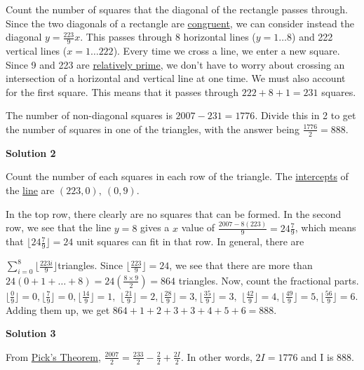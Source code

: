 \begin{enumerate}
 Count the number of squares that the diagonal of the rectangle passes through. Since the two diagonals of a rectangle are \href{https://artofproblemsolving.com/wiki/index.php?title=Congruent}{congruent}, we can consider instead the diagonal $y = \frac{223}{9}x$. This passes through 8 horizontal lines ($y = 1 \ldots 8$) and 222 vertical lines ($x = 1 \ldots 222$). Every time we cross a line, we enter a new square. Since 9 and 223 are \href{https://artofproblemsolving.com/wiki/index.php?title=Relatively\_prime}{relatively prime}, we don’t have to worry about crossing an intersection of a horizontal and vertical line at one time. We must also account for the first square. This means that it passes through $222 + 8 + 1 = 231$ squares.

 The number of non-diagonal squares is $2007 - 231 = 1776$. Divide this in 2 to get the number of squares in one of the triangles, with the answer being $\frac{1776}2 = 888$.

 



\textbf{Solution 2}

Count the number of each squares in each row of the triangle. The \href{https://artofproblemsolving.com/wiki/index.php?title=Intercept&action=edit&redlink=1}{intercepts} of the \href{https://artofproblemsolving.com/wiki/index.php?title=Line}{line} are $(223,0),\ (0,9)$.

 In the top row, there clearly are no squares that can be formed. In the second row, we see that the line $y = 8$ gives a $x$ value of $\frac{2007 - 8(223)}{9} = 24 \frac 79$, which means that $\lfloor 24 \frac 79\rfloor = 24$ unit squares can fit in that row. In general, there are

 $\sum_{i=0}^{8} \lfloor \frac{223i}{9} \rfloor$triangles. Since $\lfloor \frac{223}{9} \rfloor = 24$, we see that there are more than $24(0 + 1 + \ldots + 8) = 24(\frac{8 \times 9}{2}) = 864$ triangles. Now, count the fractional parts. $\lfloor \frac{0}{9} \rfloor = 0, \lfloor \frac{7}{9} \rfloor = 0, \lfloor \frac{14}{9} \rfloor = 1,$ $\lfloor \frac{21}{9} \rfloor = 2, \lfloor \frac{28}{9} \rfloor = 3, \lfloor \frac{35}{9} \rfloor = 3,$ $\lfloor \frac{42}{9} \rfloor = 4, \lfloor \frac{49}{9} \rfloor = 5, \lfloor \frac{56}{9} \rfloor = 6$. Adding them up, we get $864 + 1 + 2 + 3 + 3 + 4 + 5 + 6 = 888$.

 



\textbf{Solution 3}

From \href{https://artofproblemsolving.com/wiki/index.php?title=Pick\%27s\_Theorem}{Pick's Theorem}, $\frac{2007}{2}=\frac{233}{2}-\frac{2}{2}+\frac{2I}{2}$. In other words, $2I=1776$ and I is $888$.


\end{enumerate}
